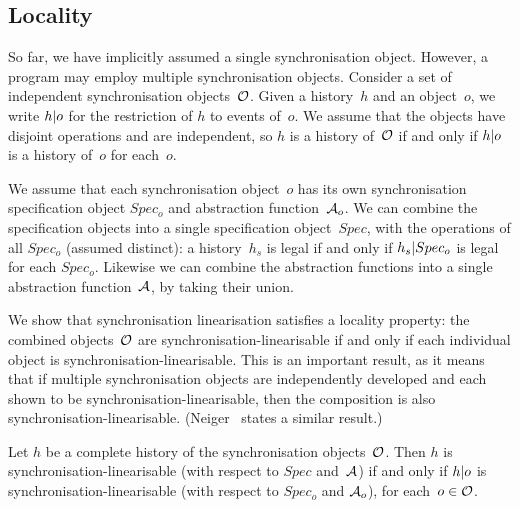 
\subsection{Locality}
\label{sec:locality}

So far, we have implicitly assumed a single synchronisation object.  However,
a program may employ multiple synchronisation objects.  Consider a set of
independent synchronisation objects~$\mathcal{O}$.  Given a history~$h$ and an
object~$o$, we write $h {\mid} o$ for the restriction of $h$ to events
of~$o$.  We assume that the objects have disjoint operations and are
independent, so $h$ is a history of~$\mathcal{O}$ if and only if $h {\mid} o$ is a
history of~$o$ for each~$o$.

We assume that each synchronisation object~$o$ has its own synchronisation
specification object $Spec_o$ and abstraction function~$\mathcal{A}_o$.  We can combine
the specification objects into a single specification object~$Spec$, with the
operations of all $Spec_o$ (assumed distinct): a history~$h_s$ is legal if and
only if $h_s {\mid} Spec_o$ is legal for each $Spec_o$.  Likewise we can
combine the abstraction functions into a single abstraction function~$\mathcal{A}$, by
taking their union.

We show that synchronisation linearisation satisfies a locality property: the
combined objects~$\mathcal{O}$ are synchronisation-linearisable if and only if each
individual object is synchronisation-linearisable.  This is an important
result, as it means that if multiple synchronisation objects are independently
developed and each shown to be synchronisation-linearisable, then the
composition is also synchronisation-linearisable.
(Neiger~\cite{Neiger-1994} states a similar result.)

\begin{lemma}
\label{lem:local}
Let $h$ be a complete history of the synchronisation objects~$\mathcal{O}$.
Then $h$ is synchronisation-linearisable (with respect to $Spec$ and~$\mathcal{A}$) if
and only if $h {\mid} o$ is synchronisation-linearisable (with respect to
$Spec_o$ and $\mathcal{A}_o$), for each~$o \in \mathcal{O}$.
\end{lemma}

